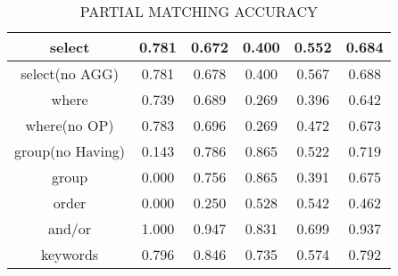 
\begin{table}[h!]
    \centering
    \begin{tabular}{|c|c|c|c|c|c|}
        \hline
        select           & 0.781 & 0.672 & 0.400 & 0.552 & 0.684 \\ \hline
        select(no AGG)   & 0.781 & 0.678 & 0.400 & 0.567 & 0.688 \\ \hline
        where            & 0.739 & 0.689 & 0.269 & 0.396 & 0.642 \\ \hline
        where(no OP)     & 0.783 & 0.696 & 0.269 & 0.472 & 0.673 \\ \hline
        group(no Having) & 0.143 & 0.786 & 0.865 & 0.522 & 0.719 \\ \hline
        group            & 0.000 & 0.756 & 0.865 & 0.391 & 0.675 \\ \hline
        order            & 0.000 & 0.250 & 0.528 & 0.542 & 0.462 \\ \hline
        and/or           & 1.000 & 0.947 & 0.831 & 0.699 & 0.937 \\ \hline

        keywords         & 0.796 & 0.846 & 0.735 & 0.574 & 0.792 \\ \hline
    \end{tabular}
    \caption{PARTIAL MATCHING ACCURACY}

\end{table}

